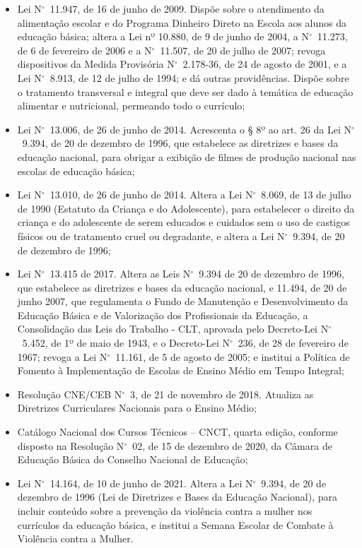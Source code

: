 \documentclass[
	12pt,				%
	openright,			%
	twoside,			%
	a4paper,			%
	chapter=TITLE,		%
	english,			%
	french,				%
	spanish,			%
	brazil,				%
	]{abntex2}
\newcommand{\n}{N$^\circ$}
\begin{document}
\begin{itemize}
   \item Lei \n~11.947, de 16 de junho de 2009. Dispõe sobre o atendimento da alimentação escolar
e do Programa Dinheiro Direto na Escola aos alunos da educação básica; altera a Lei nº
10.880, de 9 de junho de 2004, a \n~11.273, de 6 de fevereiro de 2006 e a \n~11.507, de 20 de julho de 2007; revoga dispositivos da Medida Provisória \n~2.178-36, de 24 de agosto
de 2001, e a Lei \n~8.913, de 12 de julho de 1994; e dá outras providências. Dispõe sobre o
tratamento transversal e integral que deve ser dado à temática de educação alimentar e
nutricional, permeando todo o currículo;

   \item Lei \n~13.006, de 26 de junho de 2014. Acrescenta o § 8º ao art. 26 da Lei \n~9.394, de 20
de dezembro de 1996, que estabelece as diretrizes e bases da educação nacional, para
obrigar a exibição de filmes de produção nacional nas escolas de educação básica;

   \item Lei \n~13.010, de 26 de junho de 2014. Altera a Lei \n~8.069, de 13 de julho de 1990 (Estatuto
da Criança e do Adolescente), para estabelecer o direito da criança e do adolescente
de serem educados e cuidados sem o uso de castigos físicos ou de tratamento cruel ou
degradante, e altera a Lei \n~9.394, de 20 de dezembro de 1996;

   \item Lei \n~13.415 de 2017. Altera as Leis \n~9.394 de 20 de dezembro de 1996, que estabelece as
diretrizes e bases da educação nacional, e 11.494, de 20 de junho 2007, que regulamenta
o Fundo de Manutenção e Desenvolvimento da Educação Básica e de Valorização dos
Profissionais da Educação, a Consolidação das Leis do Trabalho - CLT, aprovada pelo
Decreto-Lei \n~5.452, de 1º de maio de 1943, e o Decreto-Lei \n~236, de 28 de fevereiro
de 1967; revoga a Lei \n~11.161, de 5 de agosto de 2005; e institui a Política de Fomento à
Implementação de Escolas de Ensino Médio em Tempo Integral;

   \item Resolução CNE/CEB \n~3, de 21 de novembro de 2018. Atualiza as Diretrizes Curriculares
Nacionais para o Ensino Médio;

   \item Catálogo Nacional dos Cursos Técnicos – CNCT, quarta edição, conforme disposto na
Resolução \n~02, de 15 de dezembro de 2020, da Câmara de Educação Básica do Conselho
Nacional de Educação;

   \item Lei \n~14.164, de 10 de junho de 2021. Altera a Lei \n~9.394, de 20 de dezembro de 1996 (Lei
de Diretrizes e Bases da Educação Nacional), para incluir conteúdo sobre a prevenção da
violência contra a mulher nos currículos da educação básica, e institui a Semana Escolar de
Combate à Violência contra a Mulher.
\end{itemize}
\end{document}
